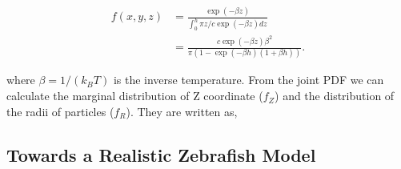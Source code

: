 \documentclass[11pt,twoside]{report}
\begin{document}
$$
\begin{aligned}
f(x, y, z) &= \frac{\exp(-\beta z)}{
	\int_0^h \pi z/c \exp(-\beta z) dz
} \\[1em]
&= \frac{c \exp(-\beta z) \beta^2}{\pi (1 - \exp(-\beta h) (1 + \beta h))}.
\end{aligned}
$$

\noindent where $\beta = 1 / (k_B T)$ is the inverse temperature. From the joint PDF we can calculate the marginal distribution of Z coordinate ($f_Z$) and the distribution of the radii of particles ($f_R$). They are written as,


\subsection{Towards a Realistic Zebrafish Model}
\end{document}

